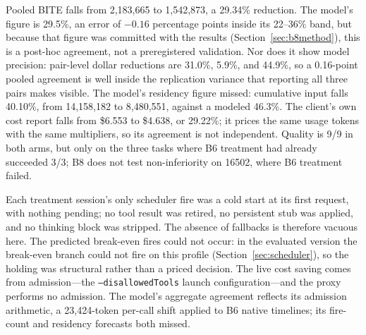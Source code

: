 \documentclass[10pt,twocolumn]{article}
\begin{document}
\begin{table}[t]
\centering
\caption{B8 v2 primary and secondary live effects.  Each pair contains three chained tasks per arm;
all 18 task instances pass the same local grading as B6.}
\label{tab:b8}
\small

\end{table}

Pooled BITE falls from 2,183,665 to 1,542,873, a 29.34\% reduction.  The model's figure is 29.5\%, an
error of $-0.16$ percentage points inside its 22--36\% band, but because that figure was committed with
the results (Section~\ref{sec:b8method}), this is a post-hoc agreement, not a preregistered validation.
Nor does it show model precision: pair-level dollar reductions are 31.0\%, 5.9\%, and 44.9\%, so a
0.16-point pooled agreement is well inside the replication variance that reporting all three pairs
makes visible.
The model's residency figure missed: cumulative input falls 40.10\%, from 14,158,182 to 8,480,551,
against a modeled 46.3\%.  The client's own cost report falls from \$6.553 to \$4.638, or 29.22\%; it
prices the same usage tokens with the same multipliers, so its agreement is not independent.  Quality
is 9/9 in both arms, but only on the three tasks where B6 treatment had already succeeded 3/3; B8 does
not test non-inferiority on 16502, where B6 treatment failed.

Each treatment session's only scheduler fire was a cold start at its first request, with nothing
pending; no tool result was retired, no persistent stub was applied, and no thinking block was stripped.
The absence of fallbacks is therefore vacuous here.  The predicted break-even fires could not occur:
in the evaluated version the break-even branch could not fire on this profile
(Section~\ref{sec:scheduler}), so the
holding was structural rather than a priced decision.  The live cost saving comes from admission---the
\texttt{--disallowedTools} launch configuration---and the proxy performs no admission.  The model's
aggregate agreement reflects its admission arithmetic, a 23,424-token per-call shift applied to B6
native timelines; its fire-count and residency forecasts both missed.

\end{document}
